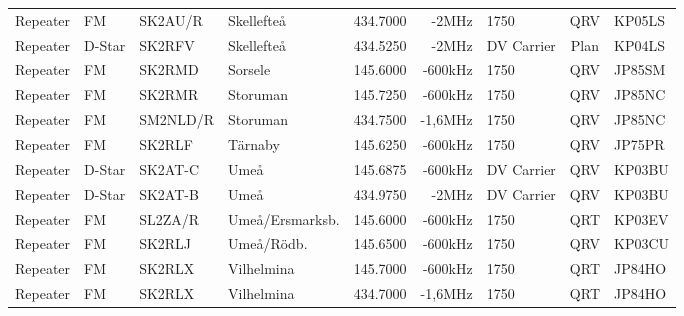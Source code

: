 \begin{landscape}
\begin{longtable}{llllrrlcl}
Repeater                          & FM            & SK2AU/R       & Skellefteå          & 434.7000          & -2MHz          & 1750             & QRV             & KP05LS           \\
Repeater                          & D-Star        & SK2RFV        & Skellefteå          & 434.5250          & -2MHz          & DV Carrier       & Plan            & KP04LS           \\
Repeater                          & FM            & SK2RMD        & Sorsele             & 145.6000          & -600kHz        & 1750             & QRV             & JP85SM           \\
Repeater                          & FM            & SK2RMR        & Storuman            & 145.7250          & -600kHz        & 1750             & QRV             & JP85NC           \\
Repeater                          & FM            & SM2NLD/R      & Storuman            & 434.7500          & -1,6MHz        & 1750             & QRV             & JP85NC           \\
Repeater                          & FM            & SK2RLF        & Tärnaby             & 145.6250          & -600kHz        & 1750             & QRV             & JP75PR           \\
Repeater                          & D-Star        & SK2AT-C       & Umeå                & 145.6875          & -600kHz        & DV Carrier       & QRV             & KP03BU           \\
Repeater                          & D-Star        & SK2AT-B       & Umeå                & 434.9750          & -2MHz          & DV Carrier       & QRV             & KP03BU           \\
Repeater                          & FM            & SL2ZA/R       & Umeå/Ersmarksb.     & 145.6000          & -600kHz        & 1750             & QRT             & KP03EV           \\
Repeater                          & FM            & SK2RLJ        & Umeå/Rödb.          & 145.6500          & -600kHz        & 1750             & QRV             & KP03CU           \\
Repeater                          & FM            & SK2RLX        & Vilhelmina          & 145.7000          & -600kHz        & 1750             & QRT             & JP84HO           \\
Repeater                          & FM            & SK2RLX        & Vilhelmina          & 434.7000          & -1,6MHz        & 1750             & QRT             & JP84HO           \\

\end{longtable}
\end{landscape}
